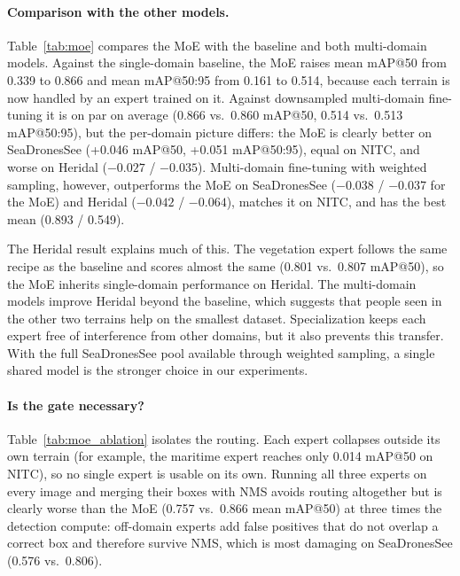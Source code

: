 \documentclass{article}
\begin{document}
\paragraph{Comparison with the other models.} Table~\ref{tab:moe} compares the MoE with the baseline and both multi-domain models. Against the single-domain baseline, the MoE raises mean mAP@50 from 0.339 to 0.866 and mean mAP@50:95 from 0.161 to 0.514, because each terrain is now handled by an expert trained on it. Against downsampled multi-domain fine-tuning it is on par on average (0.866 vs.\ 0.860 mAP@50, 0.514 vs.\ 0.513 mAP@50:95), but the per-domain picture differs: the MoE is clearly better on SeaDronesSee (+0.046 mAP@50, +0.051 mAP@50:95), equal on NITC, and worse on Heridal ($-0.027$ / $-0.035$). Multi-domain fine-tuning with weighted sampling, however, outperforms the MoE on SeaDronesSee ($-0.038$ / $-0.037$ for the MoE) and Heridal ($-0.042$ / $-0.064$), matches it on NITC, and has the best mean (0.893 / 0.549).

The Heridal result explains much of this. The vegetation expert follows the same recipe as the baseline and scores almost the same (0.801 vs.\ 0.807 mAP@50), so the MoE inherits single-domain performance on Heridal. The multi-domain models improve Heridal beyond the baseline, which suggests that people seen in the other two terrains help on the smallest dataset. Specialization keeps each expert free of interference from other domains, but it also prevents this transfer. With the full SeaDronesSee pool available through weighted sampling, a single shared model is the stronger choice in our experiments.

\paragraph{Is the gate necessary?} Table~\ref{tab:moe_ablation} isolates the routing. Each expert collapses outside its own terrain (for example, the maritime expert reaches only 0.014 mAP@50 on NITC), so no single expert is usable on its own. Running all three experts on every image and merging their boxes with NMS avoids routing altogether but is clearly worse than the MoE (0.757 vs.\ 0.866 mean mAP@50) at three times the detection compute: off-domain experts add false positives that do not overlap a correct box and therefore survive NMS, which is most damaging on SeaDronesSee (0.576 vs.\ 0.806).
\end{document}
